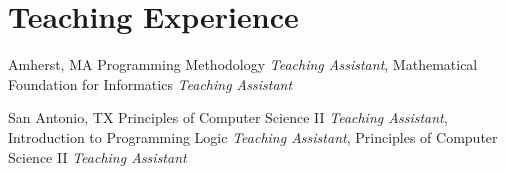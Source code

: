 \section{Teaching Experience}

%
{Amherst, MA}%
{}%
{}%
{Programming Methodology \textit{Teaching Assistant}, %
Mathematical Foundation for Informatics \textit{Teaching Assistant}%
\newline{}
}

%
{San Antonio, TX}%
{}%
{}%
{Principles of Computer Science II \textit{Teaching Assistant}, %
Introduction to Programming Logic \textit{Teaching Assistant}, %
Principles of Computer Science II \textit{Teaching Assistant} %
}